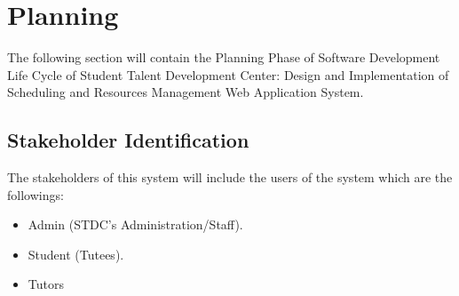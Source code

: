 \section{Planning}
\begin{justify}
    The following section will contain the Planning Phase of Software Development Life Cycle of Student Talent Development Center: Design and Implementation of Scheduling and Resources Management Web Application System.\\
\end{justify}

\subsection{Stakeholder Identification}
\begin{justify}
    The stakeholders of this system will include the users of the system which are the followings:
    \begin{itemize}[itemsep=0.1ex]
        \item Admin (STDC’s Administration/Staff).
        \item Student (Tutees).
        \item Tutors\\
    \end{itemize}
\end{justify}

